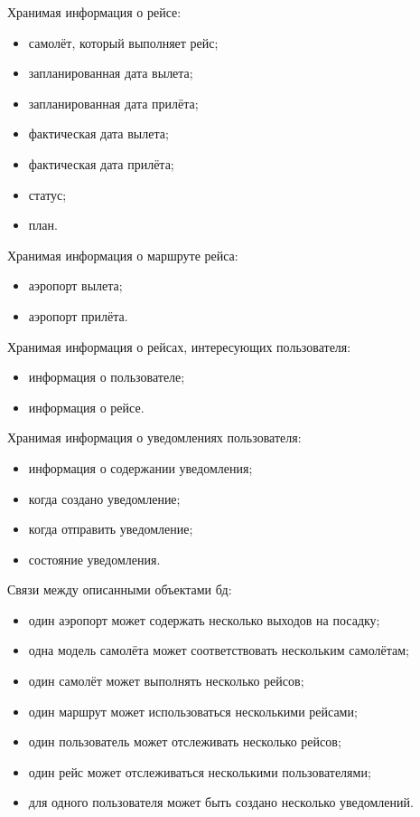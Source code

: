 Хранимая информация о рейсе:
\begin{itemize}
	\item самолёт, который выполняет рейс;
	\item запланированная дата вылета;
	\item запланированная дата прилёта;
	\item фактическая дата вылета;
	\item фактическая дата прилёта;
	\item статус;
	\item план.
\end{itemize}

Хранимая информация о маршруте рейса:
\begin{itemize}
	\item аэропорт вылета;
	\item аэропорт прилёта.
\end{itemize}

Хранимая информация о рейсах, интересующих пользователя:
\begin{itemize}
	\item информация о пользователе;
	\item информация о рейсе.
\end{itemize}

Хранимая информация о уведомлениях пользователя:
\begin{itemize}
	\item информация о содержании уведомления;
	\item когда создано уведомление;
	\item когда отправить уведомление;
	\item состояние уведомления.
\end{itemize}

Связи между описанными объектами бд:
\begin{itemize}
	\item один аэропорт может содержать несколько выходов на посадку;
	\item одна модель самолёта может соответствовать нескольким самолётам;
	\item один самолёт может выполнять несколько рейсов;
	\item один маршрут может использоваться несколькими рейсами;
	\item один пользователь может отслеживать несколько рейсов;
	\item один рейс может отслеживаться несколькими пользователями;
	\item для одного пользователя может быть создано несколько уведомлений.
\end{itemize}

